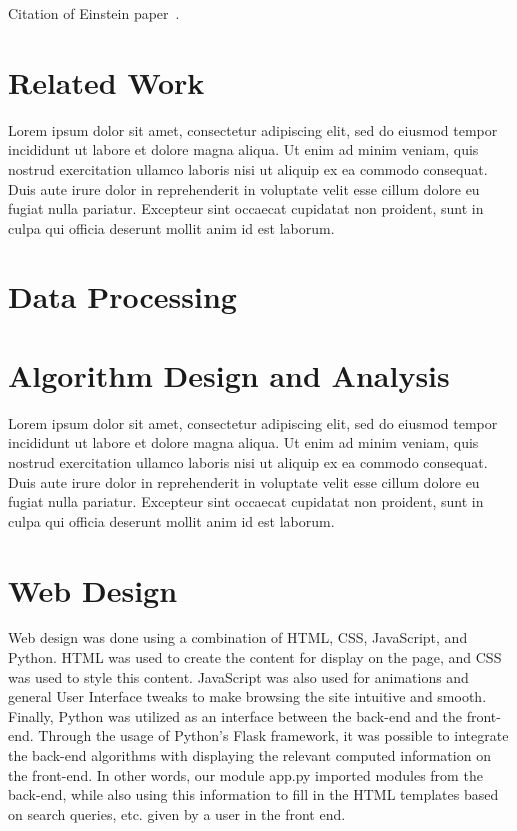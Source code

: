 \documentclass{acm_proc_article-sp}
\begin{document}
Citation of Einstein paper~\cite{Einstein}.

\section{Related Work}

Lorem ipsum dolor sit amet, consectetur adipiscing elit, sed do eiusmod tempor incididunt ut labore et dolore magna aliqua. Ut enim ad minim veniam, quis nostrud exercitation ullamco laboris nisi ut aliquip ex ea commodo consequat. Duis aute irure dolor in reprehenderit in voluptate velit esse cillum dolore eu fugiat nulla pariatur. Excepteur sint occaecat cupidatat non proident, sunt in culpa qui officia deserunt mollit anim id est laborum.

\section{Data Processing}

\section{Algorithm Design and Analysis}

Lorem ipsum dolor sit amet, consectetur adipiscing elit, sed do eiusmod tempor incididunt ut labore et dolore magna aliqua. Ut enim ad minim veniam, quis nostrud exercitation ullamco laboris nisi ut aliquip ex ea commodo consequat. Duis aute irure dolor in reprehenderit in voluptate velit esse cillum dolore eu fugiat nulla pariatur. Excepteur sint occaecat cupidatat non proident, sunt in culpa qui officia deserunt mollit anim id est laborum.


\section{Web Design}

Web design was done using a combination of HTML, CSS, JavaScript, and Python. HTML was used to create the content for display on the page, and CSS was used to style this content. JavaScript was also used for animations and general User Interface tweaks to make browsing the site intuitive and smooth. Finally, Python was utilized as an interface between the back-end and the front-end. Through the usage of Python’s Flask framework, it was possible to integrate the back-end algorithms with displaying the relevant computed information on the front-end. In other words, our module app.py imported modules from the back-end, while also using this information to fill in the HTML templates based on search queries, etc. given by a user in the front end. %
\end{document}
